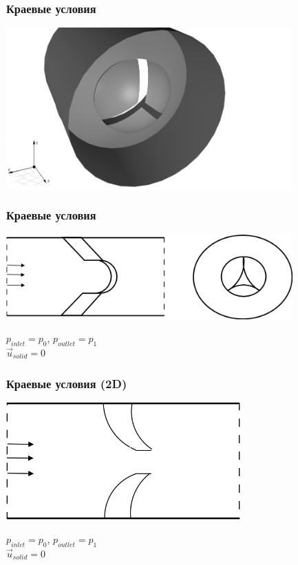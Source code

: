 \documentclass[14pt]{beamer}
\begin{document}
\begin{frame}
\frametitle{Краевые условия}
    \begin{center}
	\includegraphics[width=11cm]{valves_3d.png}
    \end{center}
\end{frame}

\begin{frame}
\frametitle{Краевые условия}
    \begin{center}
	\includegraphics[width=11cm]{complex_valve.png}
    \end{center}
    $p_{inlet}=p_0$, $p_{outlet}=p_1$\\
    $\vec u_{solid}=0$
\end{frame}

\begin{frame}
    \frametitle{Краевые условия (2D)}
    \begin{center}
	\includegraphics[width=9cm]{valves_scheme1-2d.png}
    \end{center}
    $p_{inlet}=p_0$, $p_{outlet}=p_1$\\
    $\vec u_{solid}=0$
\end{frame}
\end{document}
